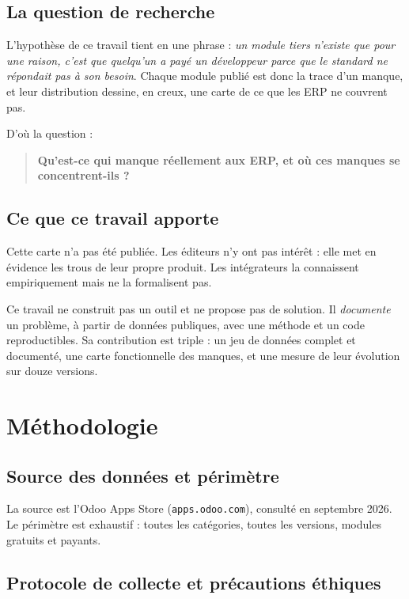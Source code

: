 \documentclass[11pt,a4paper]{article}
\begin{document}
\subsection{La question de recherche}

L'hypothèse de ce travail tient en une phrase : \emph{un module tiers n'existe
que pour une raison, c'est que quelqu'un a payé un développeur parce que le
standard ne répondait pas à son besoin}. Chaque module publié est donc la trace
d'un manque, et leur distribution dessine, en creux, une carte de ce que les
ERP ne couvrent pas.

D'où la question :

\begin{quote}
\textbf{Qu'est-ce qui manque réellement aux ERP, et où ces manques se
concentrent-ils ?}
\end{quote}

\subsection{Ce que ce travail apporte}

Cette carte n'a pas été publiée. Les éditeurs n'y ont pas intérêt : elle met en
évidence les trous de leur propre produit. Les intégrateurs la connaissent
empiriquement mais ne la formalisent pas.

Ce travail ne construit pas un outil et ne propose pas de solution. Il
\emph{documente} un problème, à partir de données publiques, avec une méthode et
un code reproductibles. Sa contribution est triple : un jeu de données complet
et documenté, une carte fonctionnelle des manques, et une mesure de leur
évolution sur douze versions.

\section{Méthodologie}

\subsection{Source des données et périmètre}

La source est l'Odoo Apps Store (\texttt{apps.odoo.com}), consulté en septembre
2026. Le périmètre est exhaustif : toutes les catégories, toutes les versions,
modules gratuits et payants.

\subsection{Protocole de collecte et précautions éthiques}
\end{document}
